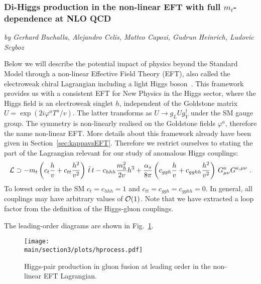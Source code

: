 \subsubsection{Di-Higgs production in the non-linear EFT with full $m_t$-dependence at NLO QCD}

\begin{center}
\textit{by Gerhard Buchalla, Alejandro Celis, Matteo Capozi, Gudrun Heinrich, Ludovic Scyboz}
\end{center}


\label{sec:EWChL.double.h}

Below we will describe  the potential impact of physics
beyond the Standard Model through a non-linear Effective Field Theory (EFT),
also called the electroweak chiral Lagrangian
including a light Higgs 
boson~\cite{Buchalla:2013rka,Buchalla:2013eza,Buchalla:2017jlu}.
This framework provides us with a consistent EFT
for New Physics in the Higgs sector, where the Higgs field is an electroweak singlet $h$,
independent of the Goldstone matrix $U = \exp(2i\varphi^a T^a/v)$.
The latter transforms as $U\to g_L U g^\dagger_Y$ under the SM gauge group.
The symmetry is non-linearly realised on the Goldstone fields
$\varphi^a$, therefore the name non-linear EFT.
More details about this framework already have been given in
Section~\ref{sec:kappavsEFT}.
Therefore we restrict ourselves to stating the part of the Lagrangian
relevant for our study of anomalous Higgs couplings:
\begin{align}
{\cal L}\supset 
-m_t\left(c_t\frac{h}{v}+c_{tt}\frac{h^2}{v^2}\right)\,\bar{t}\,t -
c_{hhh} \frac{m_h^2}{2v} h^3+\frac{\alpha_s}{8\pi} \left( c_{ggh} \frac{h}{v}+
c_{gghh}\frac{h^2}{v^2}  \right)\, G^a_{\mu \nu} G^{a,\mu \nu}\;.
\label{eq:ewchl}
\end{align}
To lowest order in the SM $c_t=c_{hhh}=1$ and $c_{tt}=c_{ggh}=c_{gghh}=0$.
In general, all couplings may have arbitrary values of ${\cal O}(1)$.
Note that we have extracted a loop factor from the definition of the
Higgs-gluon couplings.  


The leading-order diagrams are shown in Fig.~\ref{fig:hprocess}.
\begin{figure}[htb]
\begin{center}
\texttt{[image: \\main/section3/plots/hprocess.pdf]}
\end{center}
\caption{Higgs-pair production in gluon fusion at leading order
in the non-linear EFT Lagrangian.}
\label{fig:hprocess}
\end{figure}

